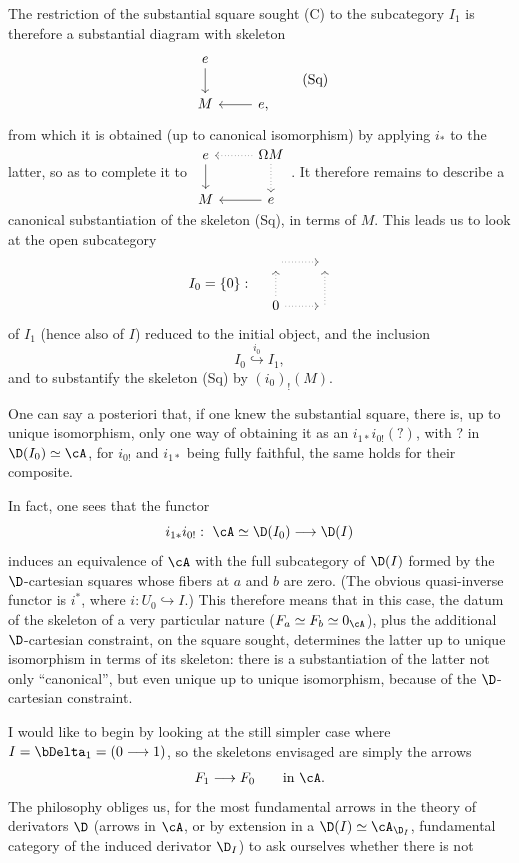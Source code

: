 
The restriction of the substantial square sought (C) to the subcategory $I_1$ is therefore a substantial diagram with skeleton
\[
\begin{tikzcd}
e \arrow[d] \\
M & e, \arrow[l]
\end{tikzcd}
\tag*{(Sq)}
\]
from which it is obtained (up to canonical isomorphism) by applying $i_*$ to the latter, so as to complete it to $\begin{tikzcd}
e \arrow[d] & \Omega M \arrow[l, dotted] \arrow[d, dotted] \\
M & e \arrow[l]
\end{tikzcd}$. It therefore remains to describe a canonical substantiation of the skeleton (Sq), in terms of $M$. This leads us to look at the open subcategory
\[
I_0 = \{0\} :\quad
\begin{tikzcd}
{} \arrow[r, dotted] & {} \\
0 \arrow[u, dotted] \arrow[r, dotted] & {} \arrow[u, dotted]
\end{tikzcd}
\]
of $I_1$ (hence also of $I$) reduced to the initial object, and the inclusion
\[
I_0 \overset{i_0}{\hookrightarrow} I_1,
\]
and to substantify the skeleton (Sq) by $(i_0)_!(M)$.

One can say a posteriori that, if one knew the substantial square, there is, up to unique isomorphism, only one way of obtaining it as an $i_{1*}i_{0!}(?)$, with ? in $\D(I_0)\simeq\cA$, for $i_{0!}$ and $i_{1*}$ being fully faithful, the same holds for their composite.


In fact, one sees that the functor
\[
i_{1*}i_{0!} :\ \cA\simeq\D(I_0) \longrightarrow \D(I)
\]
induces an equivalence of $\cA$ with the full subcategory of $\D(I)$ formed by the $\D$-cartesian squares whose fibers at $a$ and $b$ are zero. (The obvious quasi-inverse functor is $i^*$, where $i : U_0 \hookrightarrow I$.) This therefore means that in this case, the datum of the skeleton of a very particular nature ($F_a\simeq F_b\simeq 0_{\cA}$), plus the additional $\D$-cartesian constraint, on the square sought, determines the latter up to unique isomorphism in terms of its skeleton: there is a substantiation of the latter not only ``canonical'', but even unique up to unique isomorphism, because of the $\D$-cartesian constraint.

I would like to begin by looking at the still simpler case where $I=\bDelta_1=(0\longrightarrow 1)$, so the skeletons envisaged are simply the arrows
\[
F_1 \longrightarrow F_0 \qquad \text{in } \cA.
\]
The philosophy obliges us, for the most fundamental arrows in the theory of derivators $\D$ (arrows in $\cA$, or by extension in a $\D(I)\simeq\cA_{\D_I}$, fundamental category of the induced derivator $\D_I$) to ask ourselves whether there is not